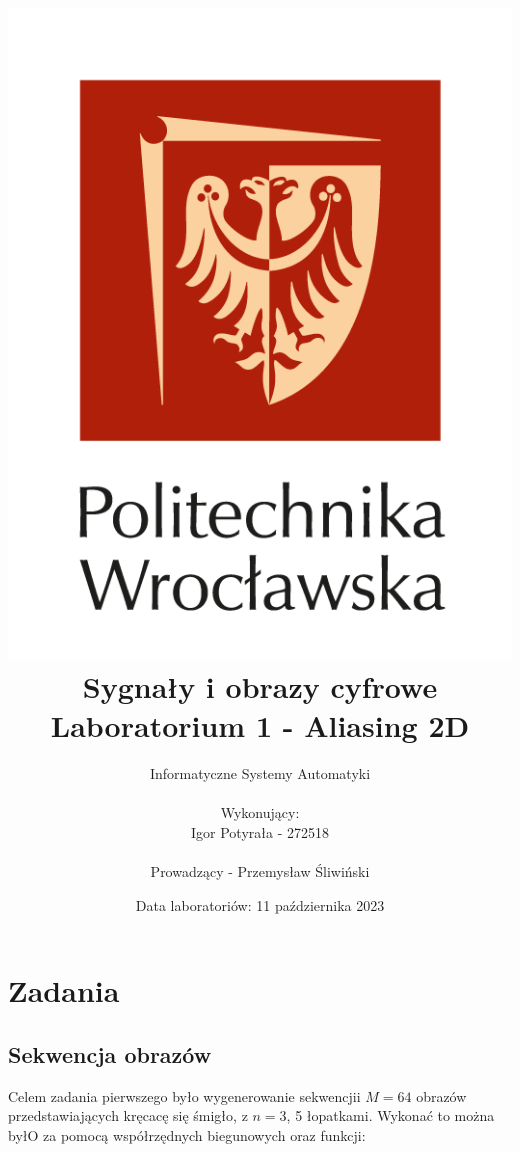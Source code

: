 \documentclass[14pt]{article}
\title{
    \includegraphics[scale=0.5]{images/logo-pwr-pion.png}
    \vspace{1cm}
    \\
    {\textbf{
    \titlefont Sygnały i obrazy cyfrowe
    \\ Laboratorium 1 - Aliasing 2D
    }}
}
\author{
    Informatyczne Systemy Automatyki
    \\
    \\ Wykonujący:
    \\ Igor Potyrała - 272518
    \\
    \\ Prowadzący - Przemysław Śliwiński
}
\date{Data laboratoriów: 11 października 2023}
\begin{document}
\maketitle
\newpage

\section{Zadania}
\subsection{Sekwencja obrazów}
Celem zadania pierwszego było wygenerowanie sekwencjii
$M = 64$ obrazów przedstawiających kręcacę się śmigło, z $n = 3$,
5 łopatkami. Wykonać to można byłO za pomocą współrzędnych
biegunowych oraz funkcji:
\end{document}
